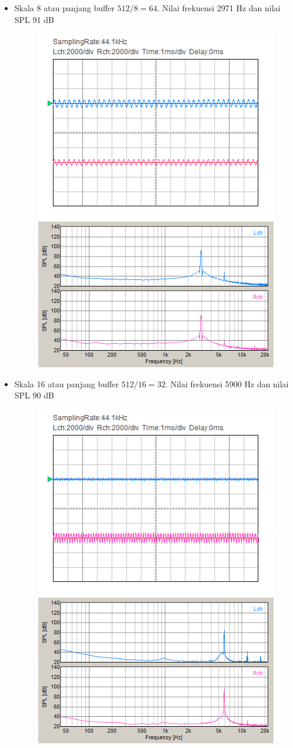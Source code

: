 \documentclass[12pt,]{article}
\begin{document}
\begin{itemize}
  		\item Skala 8 atau panjang buffer $512/8 = 64$.
  		Nilai frekuensi 2971 Hz dan nilai SPL 91 dB
  		\begin{figure}[H]
  			\centering
  			\includegraphics[width=0.45\linewidth]{result/day_4/osi_sine8}
  			\includegraphics[width=0.45\linewidth]{result/day_4/fft_sine8}
  		\end{figure}

  		\newpage
  		\item Skala 16 atau panjang buffer $512/16 = 32$.
  		Nilai frekuensi 5900 Hz dan nilai SPL 90 dB
  		\begin{figure}[H]
  			\centering
  			\includegraphics[width=0.45\linewidth]{result/day_4/osi_sine16}
  			\includegraphics[width=0.45\linewidth]{result/day_4/fft_sine16}
  		\end{figure}


\end{itemize}
\end{document}

